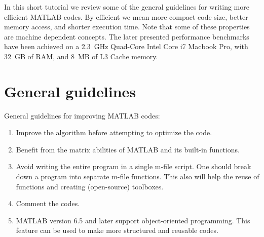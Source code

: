 \documentclass[10pt,a4paper]{article}
\begin{document}
In this short tutorial we review some of the general guidelines for writing more efficient MATLAB codes. By efficient we mean more compact code size, better memory access, and shorter execution time. Note that some of these properties are machine dependent concepts. The later presented performance benchmarks have been achieved on a 2.3~GHz Quad-Core Intel Core i7 Macbook Pro, with 32~GB of RAM, and 8~MB of L3 Cache memory.
\section{General guidelines}
\label{sec:general}
General guidelines for improving MATLAB codes:
\begin{enumerate}
\item Improve the algorithm before attempting to optimize the code.
\item Benefit from the matrix abilities of MATLAB and its built-in functions.
\item Avoid writing the entire program in a single m-file script. One should break down a program into separate m-file functions. This also will help the reuse of functions and creating (open-source) toolboxes. 
\item Comment the codes.
\item MATLAB version 6.5 and later support object-oriented programming. This feature can be used to make more structured and reusable codes.
\end{enumerate}

\end{document}
